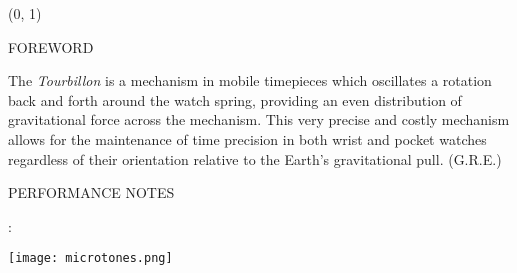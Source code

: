 \documentclass[10pt]{article}
\begin{document}
\begin{textblock}{23}(0, 1)
\begin{center}
\huge FOREWORD
\end{center}
\end{textblock}

\vspace*{0.25\baselineskip}

\begingroup
\begin{center}
\hspace{10mm} The \textit{Tourbillon} is a mechanism in mobile timepieces which oscillates a rotation back and forth around the watch spring, providing an even distribution of gravitational force across the mechanism. This very precise and costly mechanism allows for the maintenance of time precision in both wrist and pocket watches regardless of their orientation relative to the Earth's gravitational pull.
\rightskip\leftskip
\phantom{text} \hfill (G.R.E.)
\end{center}
\endgroup 


\begin{center}
\huge PERFORMANCE NOTES
\end{center}


\begin{center}
:
\end{center}

\begin{center}
\texttt{[image: microtones.png]}
\end{center}
\end{document}
